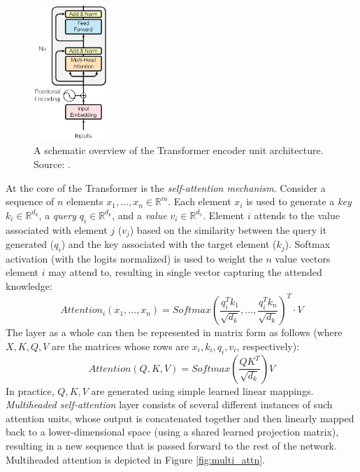 \documentclass{article}
\begin{document}
\begin{figure}
    \centering
    \vspace{-2mm}
    \includegraphics[width=0.25\textwidth]{figures/Transformer.png}
    \caption{
        A schematic overview of the Transformer encoder unit architecture. Source: \citet{vaswani2017attention}.
    }
    \label{fig:Transformer}
    \vspace{-4mm}
\end{figure}

\medskip
\noindent
At the core of the Transformer is the \emph{self-attention mechanism}. Consider a sequence of $n$ elements $x_1,...,x_n \in \mathbb{R}^m$. Each element $x_i$ is used to generate a \emph{key} $k_i \in \mathbb{R}^{d_k}$, a \emph{query} $q_i \in \mathbb{R}^{d_k}$, and a \emph{value} $v_i \in \mathbb{R}^{d_v}$. Element $i$ attends to the value associated with element $j$ ($v_j$) based on the similarity between the query it generated ($q_i$) and the key associated with the target element ($k_j$). Softmax activation (with the logits normalized) is used to weight the $n$ value vectors element $i$ may attend to, resulting in single vector capturing the attended knowledge:
\begin{equation*}
    Attention_i(x_1,...,x_n) = Softmax(\frac{q_i^T k_1}{\sqrt{d_k}}, ..., \frac{q_i^T k_n}{\sqrt{d_k}})^T \cdot V
\end{equation*}
The layer as a whole can then be represented in matrix form as follows (where $X,K,Q,V$ are the matrices whose rows are $x_i,k_i,q_i,v_i$, respectively):
\begin{equation*}
    Attention(Q,K,V) = Softmax(\frac{QK^T}{\sqrt{d_k}})V
\end{equation*}
In practice, $Q,K,V$ are generated using simple learned linear mappings. \emph{Multiheaded self-attention} layer consists of several different instances of such attention units, whose output is concatenated together and then linearly mapped back to a lower-dimensional space (using a shared learned projection matrix), resulting in a new sequence that is passed forward to the rest of the network. Multiheaded attention is depicted in Figure \ref{fig:multi_attn}.
\end{document}
